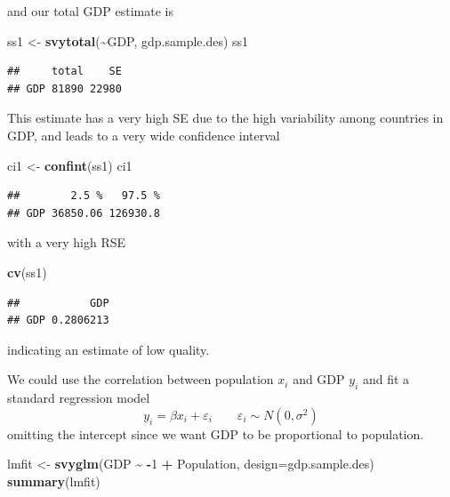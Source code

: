 \documentclass[
]{book}
\newenvironment{Shaded}{\begin{snugshade}}{\end{snugshade}}
\newcommand{\AttributeTok}[1]{\textcolor[rgb]{0.13,0.29,0.53}{#1}}
\newcommand{\DecValTok}[1]{\textcolor[rgb]{0.00,0.00,0.81}{#1}}
\newcommand{\FunctionTok}[1]{\textcolor[rgb]{0.13,0.29,0.53}{\textbf{#1}}}
\newcommand{\NormalTok}[1]{#1}
\newcommand{\OtherTok}[1]{\textcolor[rgb]{0.56,0.35,0.01}{#1}}
\newcommand{\SpecialCharTok}[1]{\textcolor[rgb]{0.81,0.36,0.00}{\textbf{#1}}}
\begin{document}
and our total GDP estimate is

\begin{Shaded}
\begin{Highlighting}[]
\NormalTok{ss1 }\OtherTok{\textless{}{-}} \FunctionTok{svytotal}\NormalTok{(}\SpecialCharTok{\textasciitilde{}}\NormalTok{GDP, gdp.sample.des)}
\NormalTok{ss1}
\end{Highlighting}
\end{Shaded}

\begin{verbatim}
##     total    SE
## GDP 81890 22980
\end{verbatim}

This estimate has a very high SE due to the high variability among
countries in GDP, and leads to a very wide confidence interval

\begin{Shaded}
\begin{Highlighting}[]
\NormalTok{ci1 }\OtherTok{\textless{}{-}} \FunctionTok{confint}\NormalTok{(ss1)}
\NormalTok{ci1}
\end{Highlighting}
\end{Shaded}

\begin{verbatim}
##        2.5 %   97.5 %
## GDP 36850.06 126930.8
\end{verbatim}

with a very high RSE

\begin{Shaded}
\begin{Highlighting}[]
\FunctionTok{cv}\NormalTok{(ss1)}
\end{Highlighting}
\end{Shaded}

\begin{verbatim}
##           GDP
## GDP 0.2806213
\end{verbatim}

indicating an estimate of low quality.

We could use the correlation between population \(x_i\) and GDP \(y_i\) and
fit a standard regression model
\[
   y_i = \beta x_i + \varepsilon_i\qquad \varepsilon_i\sim N(0,\sigma^2)
\]
omitting the intercept since we want GDP to be proportional to population.

\begin{Shaded}
\begin{Highlighting}[]
\NormalTok{lmfit }\OtherTok{\textless{}{-}} \FunctionTok{svyglm}\NormalTok{(GDP }\SpecialCharTok{\textasciitilde{}} \SpecialCharTok{{-}}\DecValTok{1} \SpecialCharTok{+}\NormalTok{ Population, }\AttributeTok{design=}\NormalTok{gdp.sample.des)}
\FunctionTok{summary}\NormalTok{(lmfit)}
\end{Highlighting}
\end{Shaded}
\end{document}
